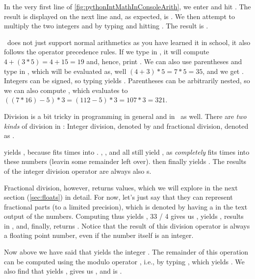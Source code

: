 In the very first line of \cref{fig:pythonIntMathInConsoleArith}, we enter  and hit \keys{\enter}.
The result is displayed on the next line and, as expected, is .
We then attempt to multiply the two integers  and  by typing  and hitting \keys{\enter}.
The result is .

\python\ does not just support normal arithmetics as you have learned it in school, it also follows the operator precedence rules.
If we type in , it will compute $4+(3*5)=4+15=19$ and, hence, print .
We can also use parentheses and type in , which will be evaluated as, well $(4+3)*5=7*5=35$, and we get .
Integers can be signed, so typing  yields .
Parentheses can be arbitrarily nested, so we can also compute , which evaluates to $((7 * 16) - 5) * 3 = (112-5)*3=107*3=321$.

Division is a bit tricky in programming in general and in \python\ as well.
There are \emph{two kinds} of division in \python: Integer division, denoted by \pythonil{//} and fractional division, denoted as \pythonil{/}.

 yields , because  fits  times into .
, , and  all still yield , as  \emph{completely} fits  times into these numbers (leavin some remainder left over).
 then finally yields .
The results of the integer division operator \pythonil{//} are always also s.

Fractional division, however, returns  values, which we will explore in the next section (\cref{sec:floats}) in detail.
For now, let's just say that they can represent fractional parts (to a limited precision), which is denoted by having a  in the text output of the numbers.
Computing  thus yields , {33 / 4} gives us ,  yields ,  results in , and, finally,  returns .
Notice that the result of this division operator is always a floating point number, even if the number itself is an integer.

Now above we have said that  yields the integer .
The remainder of this operation can be computed using the modulo operator \expandafter\pythonil{\%}, i.e., by typing , which yields .
We also find that \expandafter{} yields , \expandafter{} gives us , and \expandafter{} is .

